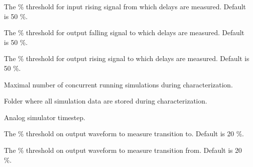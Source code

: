 \documentclass[12pt, a4paper]{article}
\begin{document}
The \% threshold for input rising signal from which delays are measured.
Default is 50 \%.



The \% threshold for output falling signal to which delays are measured.
Default is 50 \%.



The \% threshold for output rising signal to which delays are measured.
Default is 50 \%.



Maximal number of concurrent running simulations during characterization.



Folder where all simulation data are stored during characterization.



Analog simulator timestep.



The \% threshold on output waveform to measure transition to. Default is 20 \%.



The \% threshold on output waveform to measure transition from. Default is 20 \%.
\end{document}

